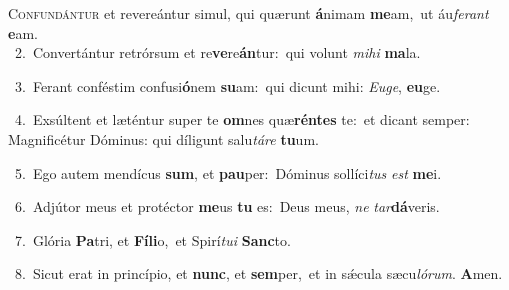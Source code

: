 \lettrine{\initial\textcolor{\initialcolor}{C}}{onfundántur} et revereántur simul, qui quærunt \textbf{á}\-nimam \textbf{me}\-am,~\star ut áu\-\textit{fe}\-\textit{rant} \textbf{e}\-am.\\
{\numbfont\textcolor{\numbcolor}{~2.}}~Convertántur retrórsum et re\-\textbf{ve}\-re\-\textbf{án}\-tur:~\star qui volunt \textit{mi}\-\textit{hi} \textbf{ma}\-la.\par
{\numbfont\textcolor{\numbcolor}{~3.}}~Ferant conféstim confusi\-\textbf{ó}\-nem \textbf{su}\-am:~\star qui dicunt mihi: \textit{Eu}\-\textit{ge}, \textbf{eu}\-ge.\par
{\numbfont\textcolor{\numbcolor}{~4.}}~Exsúltent et læténtur super te \textbf{om}\-nes quæ\-\textbf{rén}\-\textbf{tes} te:~\star et dicant semper: Magnificétur Dóminus: qui díligunt salu\-\textit{tá}\-\textit{re} \textbf{tu}\-um.\par
{\numbfont\textcolor{\numbcolor}{~5.}}~Ego autem mendícus \textbf{sum}\-, et \textbf{pau}\-per:~\star Dóminus sollíci\textit{tus} \textit{est} \textbf{me}\-i.\par
{\numbfont\textcolor{\numbcolor}{~6.}}~Adjútor meus et protéctor \textbf{me}\-us \textbf{tu} es:~\star Deus meus, \textit{ne} \textit{tar}\-\textbf{dá}veris.\par
{\numbfont\textcolor{\numbcolor}{~7.}}~Glória \textbf{Pa}\-tri, et \textbf{Fí}\-\textbf{li}o,~\star et Spirí\-\textit{tu}\-\textit{i} \textbf{Sanc}\-to.\par
{\numbfont\textcolor{\numbcolor}{~8.}}~Sicut erat in princípio, et \textbf{nunc}\-, et \textbf{sem}\-per,~\star et in sǽcula sæcu\-\textit{ló}\-\textit{rum}. \textbf{A}\-men.\par
